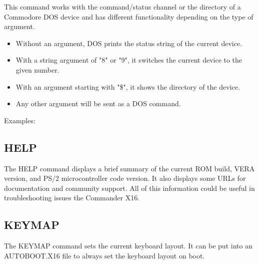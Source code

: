 This command works with the command/status channel or the directory of a
Commodore DOS device and has different functionality depending on the type of
argument.\\

\begin{itemize}

	\item Without an argument, DOS prints the status string of the current device.

	\item With a string argument of {\ttfamily "8"} or {\ttfamily "9"}, it
		switches the current device to the given number.

	\item With an argument starting with {\ttfamily "\$"}, it shows the
		directory of the device.

	\item Any other argument will be sent as a DOS command.

\end{itemize}

\vspace{16pt}

Examples:\\


\subsection{HELP}

The {\ttfamily HELP} command displays a brief summary of the current ROM build,
VERA version, and PS/2 microcontroller code version.  It also displays some
URLs for documentation and community support.  All of this information could be
useful in troubleshooting issues the Commander X16.\\


\subsection{KEYMAP}

The {\ttfamily KEYMAP} command sets the current keyboard layout. It can be put
into an {\ttfamily AUTOBOOT.X16} file to always set the keyboard layout on
boot.\\

